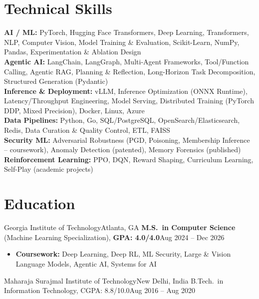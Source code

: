\documentclass[letterpaper,11pt]{article}
\begin{document}
\section{Technical Skills}
\footnotesize
\textbf{AI / ML:} PyTorch, Hugging Face Transformers, Deep Learning, Transformers, NLP, Computer Vision,
  Model Training \& Evaluation, Scikit-Learn, NumPy, Pandas, Experimentation \& Ablation Design \\[1pt]
\textbf{Agentic AI:} LangChain, LangGraph, Multi-Agent Frameworks, Tool/Function Calling, Agentic RAG,
  Planning \& Reflection, Long-Horizon Task Decomposition, Structured Generation (Pydantic) \\[1pt]
\textbf{Inference \& Deployment:} vLLM, Inference Optimization (ONNX Runtime), Latency/Throughput Engineering,
  Model Serving, Distributed Training (PyTorch DDP, Mixed Precision), Docker, Linux, Azure \\[1pt]
\textbf{Data Pipelines:} Python, Go, SQL/PostgreSQL, OpenSearch/Elasticsearch, Redis, Data Curation \&
  Quality Control, ETL, FAISS \\[1pt]
\textbf{Security ML:} Adversarial Robustness (PGD, Poisoning, Membership Inference -- coursework),
  Anomaly Detection (patented), Memory Forensics (published) \\[1pt]
\textbf{Reinforcement Learning:} PPO, DQN, Reward Shaping, Curriculum Learning, Self-Play (academic projects)

\section{Education}
\resumeSubHeadingListStart
\resumeSubheading
{Georgia Institute of Technology}{Atlanta, GA}
{\textbf{M.S.\ in Computer Science} (Machine Learning Specialization), \textbf{GPA: 4.0/4.0}}{Aug 2024 -- Dec 2026}
\vspace{2pt}
\begin{itemize}[leftmargin=0.20in, topsep=2pt, itemsep=0pt]
  \item\footnotesize{\textbf{Coursework:} Deep Learning, Deep RL, ML Security, Large \& Vision Language Models, Agentic AI, Systems for AI}
\end{itemize}
\vspace{-2pt}
\resumeEducationCompact
{Maharaja Surajmal Institute of Technology}{New Delhi, India}
{B.Tech.\ in Information Technology, CGPA: 8.8/10.0}{Aug 2016 -- Aug 2020}
\resumeSubHeadingListEnd
\end{document}
